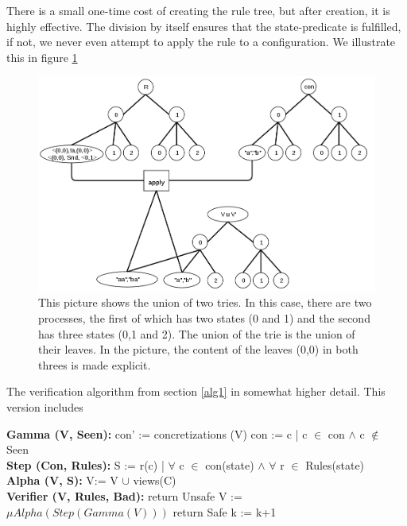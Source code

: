 There is a small one-time cost of creating the rule tree, but after creation, it is highly effective. The division by itself ensures that the state-predicate is fulfilled, if not, we never even attempt to apply the rule to a configuration. We illustrate this in figure \ref{applyrule} 

\begin{figure}
\includegraphics[width=400pt] {bilder/applyrule.png}
\caption{This picture shows the union of two tries. In this case, there are two processes, the first of which has two states (0 and 1) and the second has three states (0,1 and 2). The union of the trie is the union of their leaves. In the picture, the content of the leaves (0,0) in both threes is made explicit.}
\label{applyrule}
\end{figure}


\begin{algorithm}
  \caption{The verification algorithm from section \ref{alg1} in somewhat higher detail. This version includes }\label{euclid}
  \begin{algorithmic}[1]
    \State \textbf{Gamma (V, Seen):}
    \State \hspace{6 mm} con' := concretizations (V)
    \State \hspace{6 mm} con  := c | c $\in$ con $\land$ c $\notin$ Seen
    \\
    \State \textbf{Step (Con, Rules):}
    \State \hspace{6 mm} S := r(c) | $\forall$ c $\in$ con(state) $\land$ $\forall$ r $\in$ Rules(state)
    \EndFor
    \\            
    \State \textbf{Alpha (V, S):}
    \State \hspace{6 mm} V:= V $\cup$ views(C)
    \\
    \State \textbf{Verifier (V, Rules, Bad):}
        \State return Unsafe
        \EndIf
        \State V := $\mu Alpha(Step(Gamma(V)))$
        \State return Safe     
        \EndIf
        \State k := k+1
      \EndFor
\end{algorithmic}
\end{algorithm}


